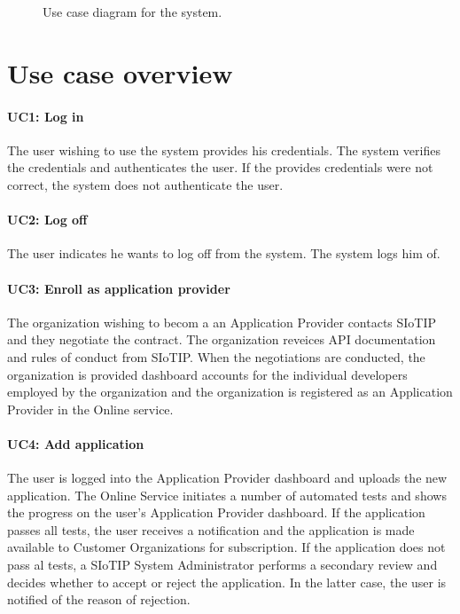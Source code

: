 \documentclass[english,peerreview]{sareport}
\begin{document}
\begin{figure}[!htp]
    \centering
    \caption{Use case diagram for the system.}\label{fig:use_case_model}
\end{figure}

\section{Use case overview}\label{sec:uc_overview}
\paragraph{UC1: Log in}
The user wishing to use the system provides his credentials.
The system verifies the credentials and authenticates the user.
If the provides credentials were not correct, the system does not authenticate the user.

\paragraph{UC2: Log off}
The user indicates he wants to log off from the system.
The system logs him of.

\paragraph{UC3: Enroll as application provider}
The organization wishing to becom a an Application Provider contacts SIoTIP and they negotiate the contract. The organization reveices API documentation and rules of conduct from SIoTIP. When the negotiations are conducted, the organization is provided dashboard accounts for the individual developers employed by the organization and the organization is registered as an Application Provider in the Online service.

\paragraph{UC4: Add application}
The user is logged into the Application Provider dashboard and uploads the new application. The Online Service initiates a number of automated tests and shows the progress on the user's Application Provider dashboard. If the application passes all tests, the user receives a notification and the application is made available to Customer Organizations for subscription. If the application does not pass al tests, a SIoTIP System Administrator performs a secondary review and decides whether to accept or reject the application. In the latter case, the user is notified of the reason of rejection.
\end{document}
